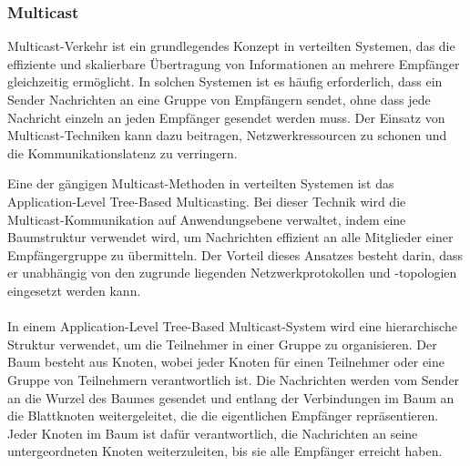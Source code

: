 \documentclass[../vs-script-first-v01.tex]{subfiles}
\begin{document}
\subsubsection{Multicast}

Multicast-Verkehr ist ein grundlegendes Konzept in verteilten Systemen, das die effiziente und skalierbare Übertragung von Informationen an mehrere Empfänger gleichzeitig ermöglicht. In solchen Systemen ist es häufig erforderlich, dass ein Sender Nachrichten an eine Gruppe von Empfängern sendet, ohne dass jede Nachricht einzeln an jeden Empfänger gesendet werden muss. Der Einsatz von Multicast-Techniken kann dazu beitragen, Netzwerkressourcen zu schonen und die Kommunikationslatenz zu verringern.

Eine der gängigen Multicast-Methoden in verteilten Systemen ist das Application-Level Tree-Based Multicasting. Bei dieser Technik wird die Multicast-Kommunikation auf Anwendungsebene verwaltet, indem eine Baumstruktur verwendet wird, um Nachrichten effizient an alle Mitglieder einer Empfängergruppe zu übermitteln. Der Vorteil dieses Ansatzes besteht darin, dass er unabhängig von den zugrunde liegenden Netzwerkprotokollen und -topologien eingesetzt werden kann.
\\\\
In einem Application-Level Tree-Based Multicast-System wird eine hierarchische Struktur verwendet, um die Teilnehmer in einer Gruppe zu organisieren. Der Baum besteht aus Knoten, wobei jeder Knoten für einen Teilnehmer oder eine Gruppe von Teilnehmern verantwortlich ist. Die Nachrichten werden vom Sender an die Wurzel des Baumes gesendet und entlang der Verbindungen im Baum an die Blattknoten weitergeleitet, die die eigentlichen Empfänger repräsentieren. Jeder Knoten im Baum ist dafür verantwortlich, die Nachrichten an seine untergeordneten Knoten weiterzuleiten, bis sie alle Empfänger erreicht haben.
\end{document}
